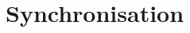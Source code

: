 \section{Synchronisation}
\label{section:node-level:synchronisation}

%  
% 
% 
% 
% 
% 
% 
% 
% 
% 
